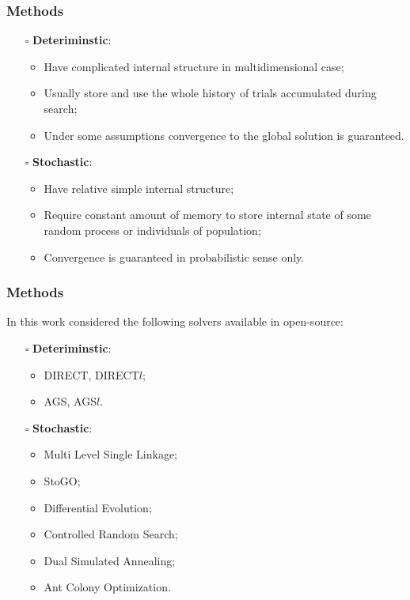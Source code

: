 \documentclass[aspectratio=1610]{beamer}
\begin{document}
\begin{frame}
  \frametitle{Methods}
  \begin{itemize}
    \item[$\square$] \textbf{Deteriminstic}:
    \begin{itemize}
      \item Have complicated internal structure in multidimensional case;
      \item Usually store and use the whole history of trials accumulated during search;
      \item Under some assumptions convergence to the global solution is guaranteed.
    \end{itemize}
    \item[$\square$] \textbf{Stochastic}:
    \begin{itemize}
      \item Have relative simple internal structure;
      \item Require constant amount of memory to store internal state of some random process or individuals of population;
      \item Convergence is guaranteed in probabilistic sense only.
    \end{itemize}
  \end{itemize}
\end{frame}

\begin{frame}
  \frametitle{Methods}
  In this work considered the following solvers available in open-source:
  \begin{itemize}
    \item[$\square$] \textbf{Deteriminstic}:
    \begin{itemize}
      \item DIRECT, DIRECT$l$;
      \item AGS, AGS$l$.
    \end{itemize}
    \item[$\square$] \textbf{Stochastic}:
    \begin{itemize}
      \item Multi Level Single Linkage;
      \item StoGO;
      \item Differential Evolution;
      \item Controlled Random Search;
      \item Dual Simulated Annealing;
      \item Ant Colony Optimization.
    \end{itemize}
  \end{itemize}
\end{frame}
\end{document}
